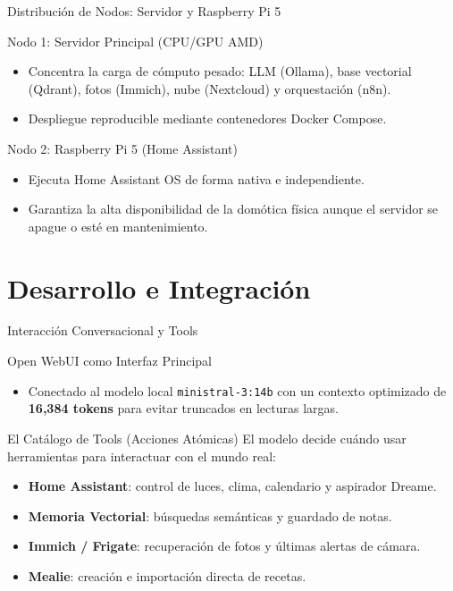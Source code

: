 \documentclass[11pt]{beamer}
\begin{document}
\begin{frame}{Distribución de Nodos: Servidor y Raspberry Pi 5}
  \begin{block}{Nodo 1: Servidor Principal (CPU/GPU AMD)}
    \begin{itemize}
      \item Concentra la carga de cómputo pesado: LLM (Ollama), base vectorial (Qdrant), fotos (Immich), nube (Nextcloud) y orquestación (n8n).
      \item Despliegue reproducible mediante contenedores Docker Compose.
    \end{itemize}
  \end{block}
  \begin{block}{Nodo 2: Raspberry Pi 5 (Home Assistant)}
    \begin{itemize}
      \item Ejecuta Home Assistant OS de forma nativa e independiente.
      \item Garantiza la alta disponibilidad de la domótica física aunque el servidor se apague o esté en mantenimiento.
    \end{itemize}
  \end{block}
\end{frame}

\section{Desarrollo e Integración}

\begin{frame}{Interacción Conversacional y Tools}
  \begin{block}{Open WebUI como Interfaz Principal}
    \begin{itemize}
      \item Conectado al modelo local \texttt{ministral-3:14b} con un contexto optimizado de \textbf{16,384 tokens} para evitar truncados en lecturas largas.
    \end{itemize}
  \end{block}
  \begin{block}{El Catálogo de Tools (Acciones Atómicas)}
    El modelo decide cuándo usar herramientas para interactuar con el mundo real:
    \begin{itemize}
      \item \textbf{Home Assistant}: control de luces, clima, calendario y aspirador Dreame.
      \item \textbf{Memoria Vectorial}: búsquedas semánticas y guardado de notas.
      \item \textbf{Immich / Frigate}: recuperación de fotos y últimas alertas de cámara.
      \item \textbf{Mealie}: creación e importación directa de recetas.
    \end{itemize}
  \end{block}
\end{frame}
\end{document}
